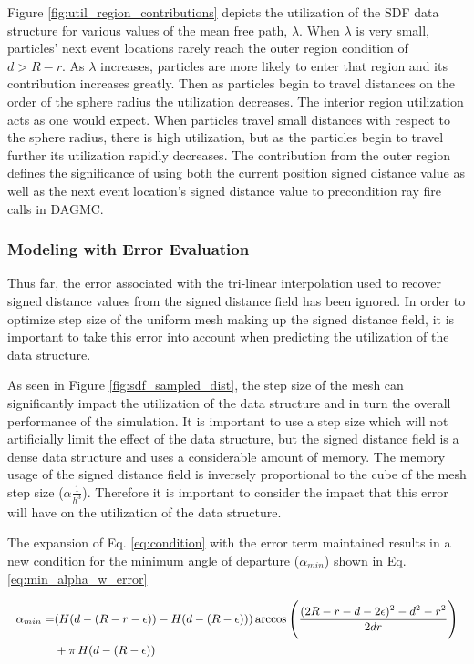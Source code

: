 Figure \ref{fig:util_region_contributions} depicts the utilization of the SDF
data structure for various values of the mean free path, $\lambda$.
When $\lambda$ is very small, particles' next event locations
rarely reach the outer region condition of $ d > R - r $. As $\lambda$ increases, particles are
more likely to enter that region and its contribution increases greatly. Then
as particles begin to travel distances on the order of the sphere radius the
utilization decreases. The interior region utilization acts as one would
expect. When particles travel small distances with respect to the sphere radius,
there is high utilization, but as the particles begin to travel further its
utilization rapidly decreases. The contribution from the outer region defines the
significance of using both the current position signed distance value as well as the
next event location's signed distance value to precondition ray fire calls in DAGMC.

\subsubsection{Modeling with Error Evaluation}

Thus far, the error associated with the tri-linear interpolation used to recover
signed distance values from the signed distance field has been ignored. In
order to optimize step size of the uniform mesh making up the signed distance
field, it is important to take this error into account when predicting the
utilization of the data structure.

As seen in Figure \ref{fig:sdf_sampled_dist}, the step size of the mesh can
significantly impact the utilization of the data structure and in turn the
overall performance of the simulation. It is important to use a step size which
will not artificially limit the effect of the data structure, but the signed
distance field is a dense data structure and uses a considerable amount of
memory. The memory usage of the signed distance field is inversely proportional
to the cube of the mesh step size ($\alpha \frac{1}{h^{3}}$). Therefore it is
important to consider the impact that this error will have on the utilization
of the data structure.

The expansion of Eq. \ref{eq:condition} with the error term maintained results in
a new condition for the minimum angle of departure ($\alpha_{min}$) shown in
Eq. \ref{eq:min_alpha_w_error}

\begin{equation}
\small
\begin{split}
\alpha_{min} =& (H(d-(R-r-\epsilon))-H(d-(R-\epsilon))) \arccos\Bigg ( \frac{(2R-r-d-2\epsilon)^2-d^2-r^2}{2 d r} \Bigg ) \\
&+ \pi \, H(d-(R-\epsilon))
\end{split}
\label{eq:min_alpha_w_error}
\end{equation}

